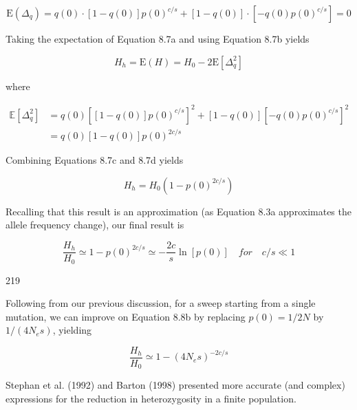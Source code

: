 \documentclass{article}
\begin{document}
\begin{equation}
\mathrm{E}(\Delta_{q})=q(0)\cdot\left[1-q(0)\right]p(0)^{c/s}+\left[1-q(0)\right]\cdot\left[-q(0)p(0)^{c/s}\right]=0
\tag{8.7b}
\label{eq:8_7b}
\end{equation}

Taking the expectation of Equation 8.7a and using Equation 8.7b yields

\begin{equation}
H_{h}=\mathrm{E}(H)=H_{0}-2\mathrm{E}\left[\Delta_{q}^{2}\right]
\tag{8.7c}
\label{eq:8_7c}
\end{equation}

where

\begin{equation}
\begin{aligned}\mathbb{E}\left[\Delta_{q}^{2}\right]&=q(0)\left[[1-q(0)]p(0)^{c/s}\right]^{2}+[1-q(0)]\left[-q(0)p(0)^{c/s}\right]^{2}\\&=q(0)[1-q(0)]p(0)^{2c/s}\end{aligned}
\tag{8.7d}
\label{eq:8_7d}
\end{equation}

Combining Equations 8.7c and 8.7d yields

\begin{equation}
H_{h}=H_{0}\left(1-p(0)^{2c/s}\right)
\tag{8.8a}
\label{eq:8_8a}
\end{equation}

Recalling that this result is an approximation (as Equation 8.3a approximates the allele frequency change), our final result is

\begin{equation}
\frac{H_{h}}{H_{0}}\simeq1-p(0)^{2c/s}\simeq-\frac{2c}{s}\ln[p(0)]\quad for\quad c/s\ll1
\tag{8.8b}
\label{eq:8_8b}
\end{equation}

219

Following from our previous discussion, for a sweep starting from a single mutation, we can improve on Equation 8.8b by replacing  $ p(0) = 1/2N $ by  $ 1/(4N_e s) $, yielding

\begin{equation}
\frac{H_{h}}{H_{0}}\simeq1-\left(4N_{e}s\right)^{-2c/s}
\tag{8.8c}
\label{eq:8_8c}
\end{equation}

Stephan et al. (1992) and Barton (1998) presented more accurate (and complex) expressions for the reduction in heterozygosity in a finite population.
\end{document}

